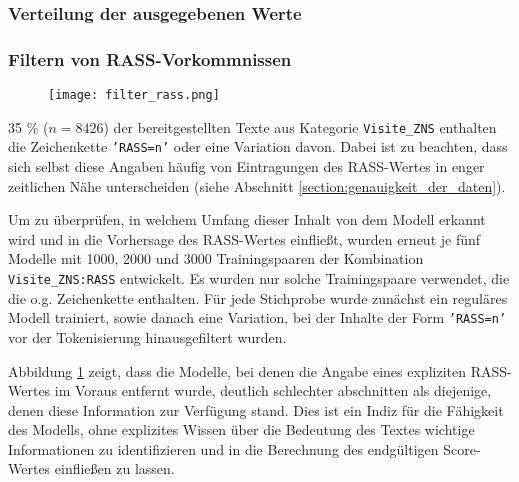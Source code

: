 \subsubsection{Verteilung der ausgegebenen Werte}

\subsubsection{Filtern von RASS-Vorkommnissen}

\begin{figure}[htb]
    \captionsetup{justification=centering}
    \centering
    \texttt{[image: filter\_rass.png]}
    \caption{}
    \label{fig:filterrass}
\end{figure}

35 \% ($n=8426$) der bereitgestellten Texte aus Kategorie \texttt{Visite\_ZNS} enthalten die Zeichenkette \texttt{'RASS=n'} oder eine Variation davon. Dabei ist zu beachten, dass sich selbst diese Angaben häufig von Eintragungen des RASS-Wertes in enger zeitlichen Nähe unterscheiden (siehe Abschnitt \ref{section:genauigkeit_der_daten}).

Um zu überprüfen, in welchem Umfang dieser Inhalt von dem Modell erkannt wird und in die Vorhersage des RASS-Wertes einfließt, wurden erneut je fünf Modelle mit 1000, 2000 und 3000 Trainingspaaren der Kombination \texttt{Visite\_ZNS:RASS} entwickelt. Es wurden nur solche Trainingspaare verwendet, die die o.g. Zeichenkette enthalten. Für jede Stichprobe wurde zunächst ein reguläres Modell trainiert, sowie danach eine Variation, bei der Inhalte der Form \texttt{'RASS=n'} vor der Tokenisierung hinausgefiltert wurden.

Abbildung \ref{fig:filterrass} zeigt, dass die Modelle, bei denen die Angabe eines expliziten RASS-Wertes im Voraus entfernt wurde, deutlich schlechter abschnitten als diejenige, denen diese Information zur Verfügung stand. Dies ist ein Indiz für die Fähigkeit des Modells, ohne explizites Wissen über die Bedeutung des Textes wichtige Informationen zu identifizieren und in die Berechnung des endgültigen Score-Wertes einfließen zu lassen.